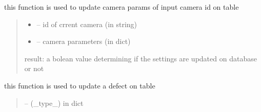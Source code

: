 \documentclass[letterpaper,10pt,english]{sphinxmanual}
\begin{document}
\begin{savenotes}
\begin{fulllineitems}
\begin{savenotes}
\begin{fulllineitems}
\begin{quote}
\begin{description}
\end{description}\end{quote}

\end{fulllineitems}\end{savenotes}


\begin{savenotes}\begin{fulllineitems}
\label{\detokenize{setting/database_utils:oxin.database_utils.dataBaseUtils.update_cam_params}}
\pysigstartsignatures
{}
\pysigstopsignatures
\sphinxAtStartPar
this function is used to update camera params of input camera id on table
\begin{quote}\begin{description}
\begin{itemize}
\item {} 
\sphinxAtStartPar
{} – id of crrent camera (in string)

\item {} 
\sphinxAtStartPar
{} – camera parameters (in dict)

\end{itemize}

\sphinxAtStartPar
result: a bolean value determining if the settings are updated on database or not

\end{description}\end{quote}

\end{fulllineitems}\end{savenotes}


\begin{savenotes}\begin{fulllineitems}
\label{\detokenize{setting/database_utils:oxin.database_utils.dataBaseUtils.update_defect}}
\pysigstartsignatures
{}
\pysigstopsignatures
\sphinxAtStartPar
this function is used to update a defect on table
\begin{quote}\begin{description}
\sphinxAtStartPar
{} – (\_type\_) in dict


\end{description}
\end{quote}
\end{fulllineitems}
\end{savenotes}
\end{fulllineitems}
\end{savenotes}
\end{document}
